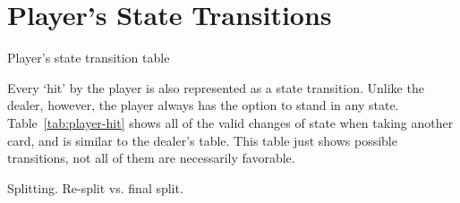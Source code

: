 \section{Player's State Transitions}
\label{sec:rules:player-hit}

\begin{table}[ht!]
\caption{Player's state transition table}
\begin{center}

\end{center}
\label{tab:player-hit}
\end{table}

Every `hit' by the player is also represented as a state transition.
Unlike the dealer, however, the player always has the option
to stand in any state.
Table~\ref{tab:player-hit} shows all of the valid changes of state
when taking another card, and is similar to the dealer's table.
This table just shows possible transitions, 
not all of them are necessarily favorable.

Splitting.  Re-split vs. final split.

